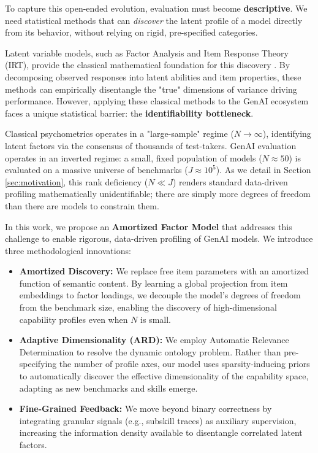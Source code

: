 \documentclass{article}
\theoremstyle{plain}
\theoremstyle{definition}
\theoremstyle{remark}
\begin{document}
To capture this open-ended evolution, evaluation must become \textbf{descriptive}. We need statistical methods that can \textit{discover} the latent profile of a model directly from its behavior, without relying on rigid, pre-specified categories.

Latent variable models, such as Factor Analysis and Item Response Theory (IRT), provide the classical mathematical foundation for this discovery \cite{spearman1904proof, lord1980applications}. By decomposing observed responses into latent abilities and item properties, these methods can empirically disentangle the "true" dimensions of variance driving performance. However, applying these classical methods to the GenAI ecosystem faces a unique statistical barrier: the \textbf{identifiability bottleneck}.

Classical psychometrics operates in a "large-sample" regime ($N \to \infty$), identifying latent factors via the consensus of thousands of test-takers. GenAI evaluation operates in an inverted regime: a small, fixed population of models ($N \approx 50$) is evaluated on a massive universe of benchmarks ($J \approx 10^5$). As we detail in Section \ref{sec:motivation}, this rank deficiency ($N \ll J$) renders standard data-driven profiling mathematically unidentifiable; there are simply more degrees of freedom than there are models to constrain them.

In this work, we propose an \textbf{Amortized Factor Model} that addresses this challenge to enable rigorous, data-driven profiling of GenAI models. We introduce three methodological innovations:

\begin{itemize}
    \item \textbf{Amortized Discovery:} We replace free item parameters with an amortized function of semantic content. By learning a global projection from item embeddings to factor loadings, we decouple the model's degrees of freedom from the benchmark size, enabling the discovery of high-dimensional capability profiles even when $N$ is small.
    \item \textbf{Adaptive Dimensionality (ARD):} We employ Automatic Relevance Determination to resolve the dynamic ontology problem. Rather than pre-specifying the number of profile axes, our model uses sparsity-inducing priors to automatically discover the effective dimensionality of the capability space, adapting as new benchmarks and skills emerge.
    \item \textbf{Fine-Grained Feedback:} We move beyond binary correctness by integrating granular signals (e.g., subskill traces) as auxiliary supervision, increasing the information density available to disentangle correlated latent factors.
\end{itemize}
\end{document}
